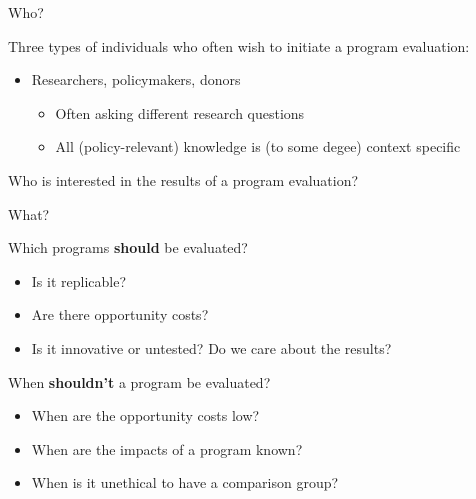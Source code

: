\documentclass[10pt,xcolor=table,ignorenonframetext,handout,aspectratio=169]{beamer}
\newlength{\wideitemsep}
\let\olditem\item
\renewcommand{\item}{\setlength{\itemsep}{\wideitemsep}\olditem}
\begin{document}

\begin{frame}{Who?}

\medskip
Three types of individuals who often wish to initiate a program evaluation:

\medskip
\begin{itemize}
	
	\item Researchers, policymakers, donors
	
	\medskip
	\begin{itemize}
		
		\item Often asking different research questions
		
		\item All (policy-relevant) knowledge is (to some degee) context specific
		
	\end{itemize}
	
\end{itemize}

\medskip
\medskip
Who is interested in the results of a program evaluation?

\end{frame}



\begin{frame}{What?}

\medskip
Which programs \textbf{should} be evaluated?

\medskip
\begin{itemize}
	
	\item Is it replicable?
	
	\item Are there opportunity costs?
	
	\item Is it innovative or untested?  Do we care about the results?
	
\end{itemize}

\medskip
\medskip
When \textbf{shouldn't} a program be evaluated?  

\medskip
\begin{itemize}
	
	\item When are the opportunity costs low?
	
	\item When are the impacts of a program known?
	
	\item When is it unethical to have a comparison group?
	
\end{itemize}

\end{frame}
\end{document}
